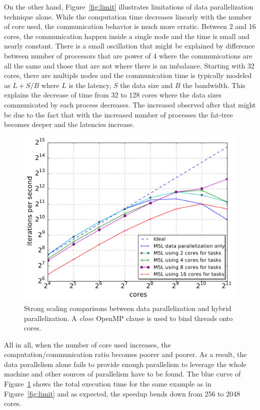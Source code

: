 On the other hand, Figure~\ref{fig:limit} illustrates limitations of data parallelization technique alone.
While the computation time decreases linearly with the number of core used, the communication behavior is much more erratic.
Between 2 and 16 cores, the communication happen inside a single node and the time is small and nearly constant.
There is a small oscillation that might be explained by difference between number of processors that are power of 4 where the communications are all the same and those that are not where there is an imbalance.
Starting with 32 cores, there are multiple nodes and the communication time is typically modeled as $L+S/B$ where $L$ is the latency, $S$ the data size and $B$ the bandwidth.
This explains the decrease of time from 32 to 128 cores where the data sizes communicated by each process decreases.
The increased observed after that might be due to the fact that with the increased number of processes the fat-tree becomes deeper and the latencies increase.

\begin{figure}[th]\begin{center}
  \includegraphics[width=.6\textwidth]{../results/task_scaling/500_200/base_close_median.pdf}
  \caption{Strong scaling comparisons between data parallelization and hybrid parallelization. A \emph{close} OpenMP clause is used to bind threads onto cores.}
  \label{fig:close}
\end{center}\end{figure}

All in all, when the number of core used increases, the computation/communication ratio becomes poorer and poorer.
As a result, the data parallelism alone fails to provide enough parallelism to leverage the whole machine and other sources of parallelism have to be found.
The blue curve of Figure~\ref{fig:close} shows the total execution time for the same example as in Figure~\ref{fig:limit} and as expected, the speedup bends down from 256 to 2048 cores.

